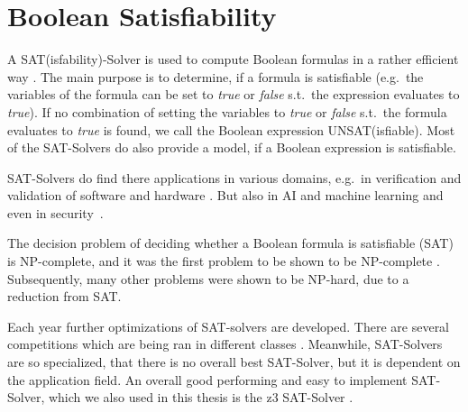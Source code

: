 \section{Boolean Satisfiability}
\label{sec:BooleanSatisfiability}

A SAT(isfability)-Solver is used to compute Boolean formulas in a rather efficient way \cite{Biere2009}. The main purpose is to determine, if a formula is satisfiable (e.g.\ the variables of the formula can be set to \emph{true} or \emph{false} s.t.\ the expression evaluates to \emph{true}). If no combination of setting the variables to \emph{true} or \emph{false} s.t.\ the formula evaluates to \emph{true} is found, we call the Boolean expression UNSAT(isfiable). Most of the SAT-Solvers do also provide a model, if a Boolean expression is satisfiable.

SAT-Solvers do find there applications in various domains, e.g.\ in verification and validation of software and hardware \cite{DBLP:conf/dagstuhl/Gogolla09, DBLP:books/daglib/0045943}. But also in AI and machine learning \cite{DBLP:phd/basesearch/Liang18a} and even in security~\cite{Pasero2022-SATHashFunctions-Repo, DBLP:journals/iacr/LinYXTS24}.

The decision problem of deciding whether a Boolean formula is satisfiable (SAT) is NP-complete, and it was the first problem to be shown to be NP-complete \cite{Cook71}. Subsequently, many other problems were shown to be NP-hard, due to a reduction from SAT.


Each year further optimizations of SAT-solvers are developed. There are several competitions which are being ran in different classes \cite{SAT-Solver-Competition}. Meanwhile, SAT-Solvers are so specialized, that there is no overall best SAT-Solver, but it is dependent on the application field. An overall good performing and easy to implement SAT-Solver, which we also used in this thesis is the z3 SAT-Solver \cite{z3-SAT-Solver}.



